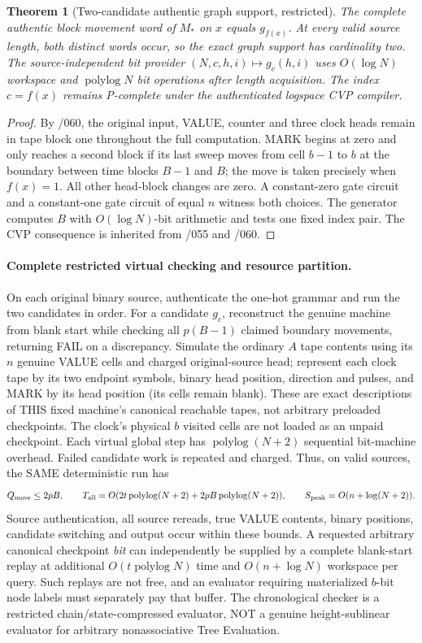 \documentclass[11pt]{article}
\newtheorem{theorem}{Theorem}
\begin{document}
\begin{theorem}[Two-candidate authentic graph support, restricted]
The complete authentic block movement word of $M_*$ on $x$
equals $g_{f(x)}$. At every valid source length, both distinct
words occur, so the exact graph support has cardinality two.
The source-independent bit provider $(N,c,h,i)\mapsto g_c(h,i)$
uses $O(\log N)$ workspace and $\operatorname{polylog}N$
bit operations after length acquisition. The index $c=f(x)$
remains P-complete under the authenticated logspace CVP compiler.
\end{theorem}
\begin{proof}
By /060, the original input, VALUE, counter and three clock
heads remain in tape block one throughout the full computation.
MARK begins at zero and only reaches a second block if its
last sweep moves from cell $b-1$ to $b$ at the boundary between
time blocks $B-1$ and $B$; the move is taken precisely when
$f(x)=1$. All other head-block changes are zero. A constant-zero
gate circuit and a constant-one gate circuit of equal $n$
witness both choices. The generator computes $B$ with
$O(\log N)$-bit arithmetic and tests one fixed index pair.
The CVP consequence is inherited from /055 and /060.
\end{proof}

\paragraph{Complete restricted virtual checking and resource partition.}
On each original binary source, authenticate the one-hot grammar
and run the two candidates in order. For a candidate $g_c$,
reconstruct the genuine machine from blank start while checking
all $p(B-1)$ claimed boundary movements, returning FAIL on a
discrepancy. Simulate the ordinary $A$ tape contents using its
$n$ genuine VALUE cells and charged original-source head; represent
each clock tape by its two endpoint symbols, binary head position,
direction and pulses, and MARK by its head position (its cells
remain blank). These are exact descriptions of THIS fixed machine's
canonical reachable tapes, not arbitrary preloaded checkpoints.
The clock's physical $b$ visited cells are not loaded as an
unpaid checkpoint. Each virtual global step has
$\operatorname{polylog}(N+2)$ sequential bit-machine overhead.
Failed candidate work is repeated and charged. Thus, on valid
sources, the SAME deterministic run has
\[
 Q_{\rm move}\le2pB,\qquad
 T_{\rm all}=O(2t\operatorname{polylog}(N+2)+
       2pB\operatorname{polylog}(N+2)),
 \qquad
 S_{\rm peak}=O(n+\log(N+2)).
\]
Source authentication, all source rereads, true VALUE contents,
binary positions, candidate switching and output occur within these
bounds. A requested arbitrary canonical checkpoint \emph{bit}
can independently be supplied by a complete blank-start replay
at additional $O(t\operatorname{polylog}N)$ time and
$O(n+\log N)$ workspace per query. Such replays are not
free, and an evaluator requiring materialized $b$-bit node labels
must separately pay that buffer. The chronological checker is
a restricted chain/state-compressed evaluator, NOT a genuine
height-sublinear evaluator for arbitrary nonassociative Tree Evaluation.
\end{document}
